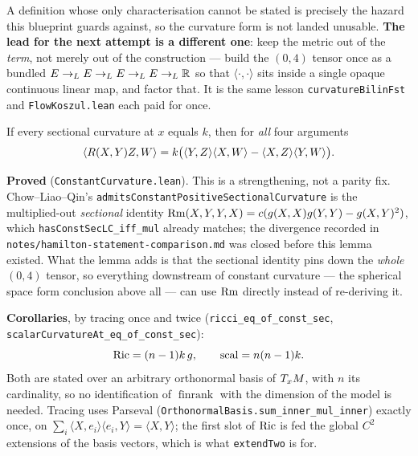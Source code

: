 \begin{lemma}
  A definition whose only characterisation cannot be stated is precisely the hazard this
  blueprint guards against, so the curvature form is not landed unusable. \textbf{The lead for
  the next attempt is a different one}: keep the metric out of the \emph{term}, not merely out
  of the construction --- build the $(0,4)$ tensor once as a bundled
  $E \to_L E \to_L E \to_L E \to_L \mathbb{R}$ so that $\langle\cdot,\cdot\rangle$ sits inside a single
  opaque continuous linear map, and factor that. It is the same lesson
  \texttt{curvatureBilinFst} and \texttt{FlowKoszul.lean} each paid for once.
\end{lemma}

\begin{lemma}
  \label{lem:const-sec-determines-rm}
  \leanok
  If every sectional curvature at $x$ equals $k$, then for \emph{all} four
  arguments
  \[
    \langle R(X,Y)Z, W\rangle
      = k\big(\langle Y,Z\rangle\langle X,W\rangle
             - \langle X,Z\rangle\langle Y,W\rangle\big).
  \]

  \textbf{Proved} (\texttt{ConstantCurvature.lean}). This is a strengthening,
  not a parity fix. Chow--Liao--Qin's
  \texttt{admitsConstantPositiveSectionalCurvature} is the multiplied-out
  \emph{sectional} identity $\operatorname{Rm}(X,Y,Y,X) = c(g(X,X)g(Y,Y) - g(X,Y)^2)$,
  which \texttt{hasConstSecLC\_iff\_mul} already matches; the divergence
  recorded in \texttt{notes/hamilton-statement-comparison.md} was closed before
  this lemma existed. What the lemma adds is that the sectional identity pins
  down the \emph{whole} $(0,4)$ tensor, so everything downstream of constant
  curvature --- the spherical space form conclusion above all --- can use $\operatorname{Rm}$
  directly instead of re-deriving it.

  \textbf{Corollaries}, by tracing once and twice
  (\texttt{ricci\_eq\_of\_const\_sec},
  \texttt{scalarCurvatureAt\_eq\_of\_const\_sec}):
  \[
    \operatorname{Ric} = (n-1)k\,g, \qquad \operatorname{scal} = n(n-1)k .
  \]
  Both are stated over an arbitrary orthonormal basis of $T_xM$, with $n$ its
  cardinality, so no identification of $\operatorname{finrank}$ with the
  dimension of the model is needed. Tracing uses Parseval
  (\texttt{OrthonormalBasis.sum\_inner\_mul\_inner}) exactly once, on
  $\sum_i \langle X, e_i\rangle \langle e_i, Y\rangle = \langle X, Y\rangle$;
  the first slot of $\operatorname{Ric}$ is fed the global $C^2$ extensions of the basis
  vectors, which is what \texttt{extendTwo} is for.


\end{lemma}
